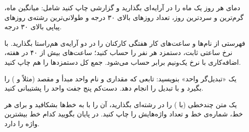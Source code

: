 \exercise دمای هر روز یک ماه را در آرایه‌ای بگذارید و گزارشی چاپ کنید
شامل: میانگین ماه، گرم‌ترین و سردترین روز، تعداد روزهای بالای ۳۰ درجه و
طولانی‌ترین رشته‌ی روزهای پیاپی بالای ۳۰ درجه.

\exercise فهرستی از نام‌ها و ساعت‌های کار هفتگی کارکنان را در دو آرایه‌ی
هم‌راستا بگذارید. با نرخ ساعتی ثابت، دستمزد هر نفر را حساب کنید؛ ساعت‌های
بیش از ۴۰ در هفته، اضافه‌کاری با نرخ یک‌ونیم برابر حساب می‌شود. جمع کل
دستمزدها را هم چاپ کنید.

\exercise یک «تبدیل‌گر واحد» بنویسید: تابعی که مقداری و نام واحد مبدأ و
مقصد (مثلاً  و ) را بگیرد و با  تبدیل
را انجام دهد. دست‌کم پنج جفت واحد را پشتیبانی کنید.

\exercise یک متن چندخطی (با ) را در رشته‌ای بگذارید،
آن را با  به خط‌ها بشکافید و برای هر خط،
شماره‌ی خط و تعداد واژه‌هایش را چاپ کنید. در پایان بگویید کدام خط بیشترین
واژه را دارد.
